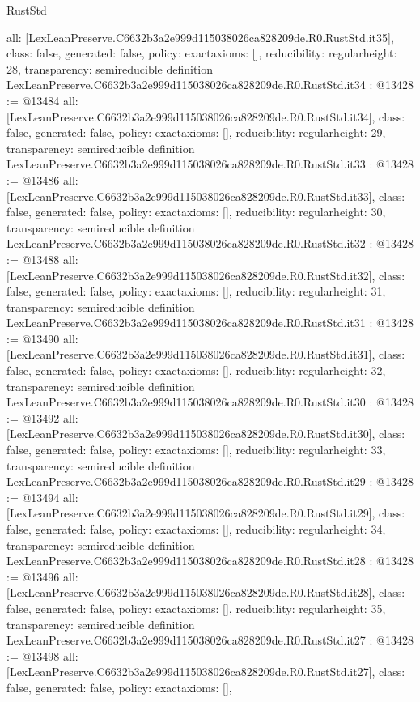 \begin{lexlean}{RustStd}
\begin{coremodule}
{  all: [LexLeanPreserve.C6632b3a2e999d115038026ca828209de.R0.RustStd.it35],
  class: false,
  generated: false,
  policy: exact{axioms: []},
  reducibility: regular{height: 28},
  transparency: semireducible
}
definition LexLeanPreserve.C6632b3a2e999d115038026ca828209de.R0.RustStd.it34 : @13428 := @13484 {
  all: [LexLeanPreserve.C6632b3a2e999d115038026ca828209de.R0.RustStd.it34],
  class: false,
  generated: false,
  policy: exact{axioms: []},
  reducibility: regular{height: 29},
  transparency: semireducible
}
definition LexLeanPreserve.C6632b3a2e999d115038026ca828209de.R0.RustStd.it33 : @13428 := @13486 {
  all: [LexLeanPreserve.C6632b3a2e999d115038026ca828209de.R0.RustStd.it33],
  class: false,
  generated: false,
  policy: exact{axioms: []},
  reducibility: regular{height: 30},
  transparency: semireducible
}
definition LexLeanPreserve.C6632b3a2e999d115038026ca828209de.R0.RustStd.it32 : @13428 := @13488 {
  all: [LexLeanPreserve.C6632b3a2e999d115038026ca828209de.R0.RustStd.it32],
  class: false,
  generated: false,
  policy: exact{axioms: []},
  reducibility: regular{height: 31},
  transparency: semireducible
}
definition LexLeanPreserve.C6632b3a2e999d115038026ca828209de.R0.RustStd.it31 : @13428 := @13490 {
  all: [LexLeanPreserve.C6632b3a2e999d115038026ca828209de.R0.RustStd.it31],
  class: false,
  generated: false,
  policy: exact{axioms: []},
  reducibility: regular{height: 32},
  transparency: semireducible
}
definition LexLeanPreserve.C6632b3a2e999d115038026ca828209de.R0.RustStd.it30 : @13428 := @13492 {
  all: [LexLeanPreserve.C6632b3a2e999d115038026ca828209de.R0.RustStd.it30],
  class: false,
  generated: false,
  policy: exact{axioms: []},
  reducibility: regular{height: 33},
  transparency: semireducible
}
definition LexLeanPreserve.C6632b3a2e999d115038026ca828209de.R0.RustStd.it29 : @13428 := @13494 {
  all: [LexLeanPreserve.C6632b3a2e999d115038026ca828209de.R0.RustStd.it29],
  class: false,
  generated: false,
  policy: exact{axioms: []},
  reducibility: regular{height: 34},
  transparency: semireducible
}
definition LexLeanPreserve.C6632b3a2e999d115038026ca828209de.R0.RustStd.it28 : @13428 := @13496 {
  all: [LexLeanPreserve.C6632b3a2e999d115038026ca828209de.R0.RustStd.it28],
  class: false,
  generated: false,
  policy: exact{axioms: []},
  reducibility: regular{height: 35},
  transparency: semireducible
}
definition LexLeanPreserve.C6632b3a2e999d115038026ca828209de.R0.RustStd.it27 : @13428 := @13498 {
  all: [LexLeanPreserve.C6632b3a2e999d115038026ca828209de.R0.RustStd.it27],
  class: false,
  generated: false,
  policy: exact{axioms: []},
}
\end{coremodule}
\end{lexlean}
